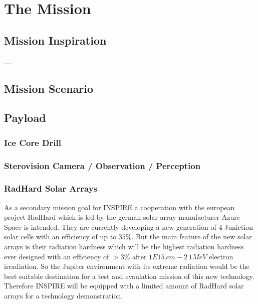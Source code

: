%
%
%
\chapter{The Mission}
\label{chap:mission}

\section{Mission Inspiration}
\label{sec:inspiration}
....



\section{Mission Scenario}
\label{sec:scenario}


\section{Payload}


\subsection{Ice Core Drill}

\subsection{Sterovision Camera / Observation / Perception}

\subsection{RadHard Solar Arrays}
\label{subsec:radhard}
As a secondary mission goal for INSPIRE a cooperation with the european project RadHard which is led by the german solar array manufacturer Azure Space is intended. They are currently developing a new generation of 4 Juniction solar cells with an efficiency of up to $35 \% $. But the main feature of the new solar arrays is their radiation hardness which will be the highest radiation hardness ever designed with an efficiency of $>3 \% $ after $1E15 \ cm-2 \ 1MeV$ electron irradiation. So the Jupiter environment with its extreme radiation would be the best suitable destination for a test and evaulation mission of this new technology. Therefore INSPIRE will be equipped with a limited amount of RadHard solar arrays for a technology demonstration.


